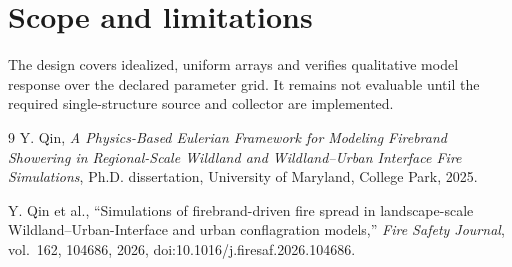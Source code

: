 \section{Scope and limitations}
The design covers idealized, uniform arrays and verifies qualitative model response over the declared parameter grid. It remains not evaluable until the required single-structure source and collector are implemented.

\begin{thebibliography}{9}
Y. Qin, \emph{A Physics-Based Eulerian Framework for Modeling Firebrand
Showering in Regional-Scale Wildland and Wildland--Urban Interface Fire
Simulations}, Ph.D. dissertation, University of Maryland, College Park, 2025.

Y. Qin et al., ``Simulations of firebrand-driven fire spread in
landscape-scale Wildland--Urban-Interface and urban conflagration models,''
\emph{Fire Safety Journal}, vol.~162, 104686, 2026,
doi:10.1016/j.firesaf.2026.104686.
\end{thebibliography}
